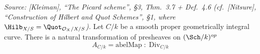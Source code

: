 \begin{lemma}
  \label{lem:line_bundle_quot_correspondence}
  \textit{Source: [Kleiman], ``The Picard scheme'', \S 3,
  Thm.~3.7 + Def.~4.6 (cf.\ [Nitsure], ``Construction of Hilbert
  and Quot Schemes'', \S 1, where \(\Hilb_{X/S} = \Quot_{\mathcal{O}_X/X/S}\)).}
  Let \(C/k\) be a smooth proper geometrically integral curve. There is a
  natural transformation of presheaves on \((\Sch/k)^{op}\)
  \[
    A_{C/k} = \mathrm{abelMap} \;\colon\; \mathrm{Div}_{C/k}
\]
\end{lemma}
